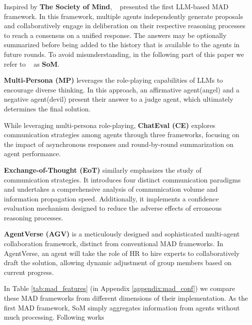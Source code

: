Inspired by \textbf{The Society of Mind}, ~\citet{duimproving} presented the first LLM-based MAD framework. In this framework, multiple agents independently generate proposals and collaboratively engage in deliberation on their respective reasoning processes to reach a consensus on a unified response. The answers may be optionally summarized before being added to the history that is available to the agents in future rounds. To avoid misunderstanding, in the following part of this paper we refer to ~\citet{duimproving} as \textbf{SoM}.

\textbf{Multi-Persona (MP)} \cite{liang2023encouraging} leverages the role-playing capabilities of LLMs to encourage diverse thinking. In this approach, an affirmative agent(angel) and a negative agent(devil) present their answer to a judge agent, which ultimately determines the final solution.

While leveraging multi-persona role-playing, \textbf{ChatEval (CE)} \cite{chanchateval} explores communication strategies among agents through three frameworks, focusing on the impact of asynchronous responses and round-by-round summarization on agent performance.


\textbf{Exchange-of-Thought (EoT)} \cite{yin2023exchange} similarly emphasizes the study of communication strategies. It introduces four distinct communication paradigms and undertakes a comprehensive analysis of communication volume and information propagation speed. Additionally, it implements a confidence evaluation mechanism designed to reduce the adverse effects of erroneous reasoning processes.


\textbf{AgentVerse (AGV)} \cite{chen2023agentverse} is a meticulously designed and sophisticated multi-agent collaboration framework, distinct from conventional MAD frameworks. In AgentVerse, an agent will take the role of HR to hire experts to collaboratively draft the solution, allowing dynamic adjustment of group members based on current progress.


In Table \ref{tab:mad_features} (in Appendix \ref{appendix:mad_conf}) we compare these MAD frameworks from different dimensions of their implementation. As the first MAD framework, SoM simply aggregates information from agents without much processing. Following works 